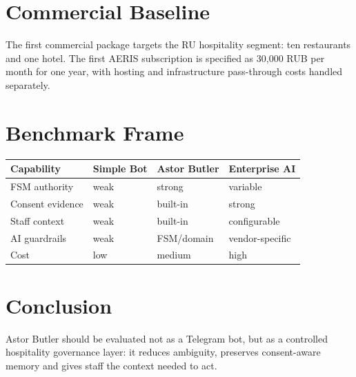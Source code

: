\documentclass[11pt,a4paper]{article}
\begin{document}
\section{Commercial Baseline}
The first commercial package targets the RU hospitality segment: ten restaurants and one hotel. The first AERIS subscription is specified as 30,000 RUB per month for one year, with hosting and infrastructure pass-through costs handled separately.

\section{Benchmark Frame}
\begin{table}[h]
\centering
\begin{tabular}{llll}
\toprule
Capability & Simple Bot & Astor Butler & Enterprise AI \\
\midrule
FSM authority & weak & strong & variable \\
Consent evidence & weak & built-in & strong \\
Staff context & weak & built-in & configurable \\
AI guardrails & weak & FSM/domain & vendor-specific \\
Cost & low & medium & high \\
\bottomrule
\end{tabular}
\end{table}

\section{Conclusion}
Astor Butler should be evaluated not as a Telegram bot, but as a controlled hospitality governance layer: it reduces ambiguity, preserves consent-aware memory and gives staff the context needed to act.
\end{document}
